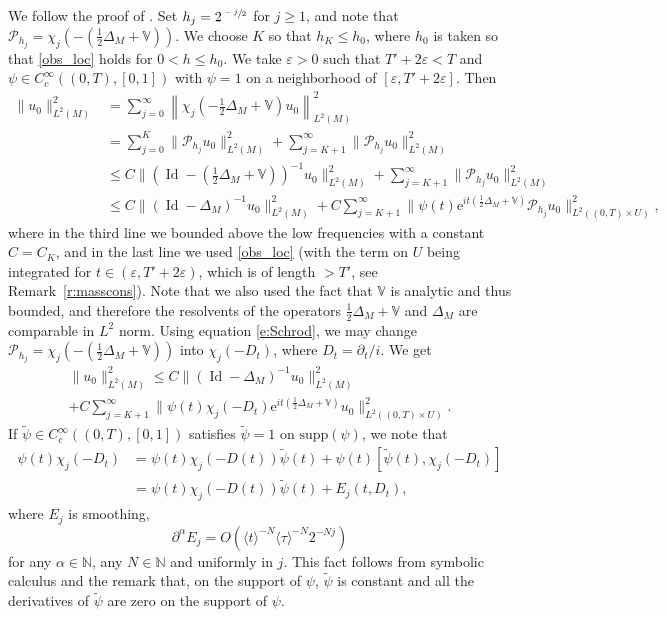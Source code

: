 \documentclass[10pt]{amsart}
\let\mathcal\mathscr
\newcommand{\rme}{\mathrm{e}}
\DeclareMathOperator{\Id}{Id}
\theoremstyle{plain}
\theoremstyle{definition}
\def\N{{\mathbb N}}
\def\bbV{{\mathbb V}}
\begin{document}
We follow the proof of \cite[Prop.\,4.1]{BZ}. Set $h_j=2^{\sfrac{-j}{2}}$ for $j\geq 1$, and note that $\mathcal{P}_{h_j}=\chi_j(-(\frac12\Delta_M+\bbV))$. We choose $K$ so that $h_K\leq h_0$, where $h_0$ is taken so that \eqref{obs_loc} holds for $0<h\leq h_0$. We take $\varepsilon>0$ such that $T'+2\varepsilon<T$ and $\psi\in C_c^\infty((0,T),[0,1])$ with $\psi=1$ on a neighborhood of $[\varepsilon,T'+2\varepsilon]$. Then
\begin{align*}
\|u_0\|_{L^2(M)}^2&=\sum_{j=0}^\infty \left\|\chi_j\left(-\tfrac12\Delta_M+\bbV\right)u_0\right\|^2_{L^2(M)}\\
&= \sum_{j=0}^K \|\mathcal{P}_{h_j}u_0\|^2_{L^2(M)}+\sum_{j=K+1}^\infty \|\mathcal{P}_{h_j}u_0\|^2_{L^2(M)} \\
&\leq C \bigl\|\left(\Id-(\tfrac12\Delta_M+\bbV)\right)^{-1}u_0\bigr\|^2_{L^2(M)}+\sum_{j=K+1}^\infty \|\mathcal{P}_{h_j}u_0\|^2_{L^2(M)} \\
&\leq C\|(\Id-\Delta_M)^{-1}u_0\|^2_{L^2(M)}+C\sum_{j=K+1}^\infty \bigl\| \psi(t) \rme^{it(\frac12 \Delta_M+\bbV)}\mathcal{P}_{h_j} u_0\bigr\|^2_{L^2((0,T)\times U)},
\end{align*}
where in the third line we bounded above the low frequencies with a constant $C=C_K$, and in the last line we used \eqref{obs_loc} (with the term on $U$ being integrated for $t\in (\varepsilon,T'+2\varepsilon)$, which is of length $>T'$, see Remark~\ref{r:masscons}). Note that we also used the fact that $\bbV$ is analytic and thus bounded, and therefore the resolvents of the operators $\frac12\Delta_M+\bbV$ and $\Delta_M$ are comparable in $L^2$ norm.
Using equation \eqref{e:Schrod}, we may change $\mathcal{P}_{h_j}=\chi_j(-(\frac12\Delta_M+\bbV))$ into $\chi_j(-D_t)$, where $D_t=\partial_t/i$. We get
\begin{multline*}
\|u_0\|_{L^2(M)}^2\leq C\|(\Id-\Delta_M)^{-1}u_0\|^2_{L^2(M)}\\+C\sum_{j=K+1}^\infty \bigl\|\psi(t) \chi_j(-D_t) \rme^{it(\frac12 \Delta_M+\bbV)} u_0 \bigr\|^2_{L^2((0,T)\times U)}.
\end{multline*}
If $\widetilde{\psi}\in C_c^\infty((0,T),[0,1])$ satisfies $\widetilde{\psi}=1$ on $\text{supp}(\psi)$, we note that
\[
\begin{split}
\psi(t)\chi_j(-D_t)&=\psi(t)\chi_j(-D(t))\widetilde{\psi}(t)+\psi(t)[\widetilde{\psi}(t),\chi_j(-D_t)] \\
&=\psi(t)\chi_j(-D(t))\widetilde{\psi}(t)+E_j(t,D_t),
\end{split}
\]
where $E_j$ is smoothing, \ie
\begin{equation*}
\partial^\alpha E_j=O(\langle t\rangle^{-N}\langle\tau\rangle^{-N}2^{-Nj})
\end{equation*}
for any $\alpha\in\N$, any $N\in\N$ and uniformly in $j$. This fact follows from symbolic calculus and the remark that, on the support of $\psi$, $\widetilde{\psi}$ is constant and
all the derivatives of $\widetilde \psi$ are zero on the support of $\psi$.
\end{document}
